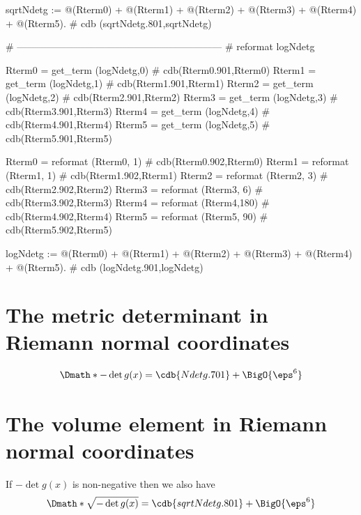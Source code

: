 \documentclass[12pt]{cdblatex}
\begin{document}
\begin{cadabra}
   sqrtNdetg := @(Rterm0) + @(Rterm1) + @(Rterm2) + @(Rterm3) + @(Rterm4) + @(Rterm5).  # cdb (sqrtNdetg.801,sqrtNdetg)

   # ---------------------------------------------------------------
   # reformat logNdetg

   Rterm0 = get_term (logNdetg,0)    # cdb(Rterm0.901,Rterm0)
   Rterm1 = get_term (logNdetg,1)    # cdb(Rterm1.901,Rterm1)
   Rterm2 = get_term (logNdetg,2)    # cdb(Rterm2.901,Rterm2)
   Rterm3 = get_term (logNdetg,3)    # cdb(Rterm3.901,Rterm3)
   Rterm4 = get_term (logNdetg,4)    # cdb(Rterm4.901,Rterm4)
   Rterm5 = get_term (logNdetg,5)    # cdb(Rterm5.901,Rterm5)

   Rterm0 = reformat (Rterm0,  1)    # cdb(Rterm0.902,Rterm0)
   Rterm1 = reformat (Rterm1,  1)    # cdb(Rterm1.902,Rterm1)
   Rterm2 = reformat (Rterm2,  3)    # cdb(Rterm2.902,Rterm2)
   Rterm3 = reformat (Rterm3,  6)    # cdb(Rterm3.902,Rterm3)
   Rterm4 = reformat (Rterm4,180)    # cdb(Rterm4.902,Rterm4)
   Rterm5 = reformat (Rterm5, 90)    # cdb(Rterm5.902,Rterm5)

   logNdetg := @(Rterm0) + @(Rterm1) + @(Rterm2) + @(Rterm3) + @(Rterm4) + @(Rterm5).  # cdb (logNdetg.901,logNdetg)

\end{cadabra}

\clearpage

\section*{The metric determinant in Riemann normal coordinates}

\begin{dgroup*}
   \Dmath*{-\det g(x) = \cdb{Ndetg.701}+\BigO{\eps^6}}
\end{dgroup*}

\section*{The volume element in Riemann normal coordinates}

If $-\det g(x)$ is non-negative then we also have
%
\begin{dgroup*}
   \Dmath*{\sqrt{-\det g(x)} = \cdb{sqrtNdetg.801}+\BigO{\eps^6}}
\end{dgroup*}
\end{document}
